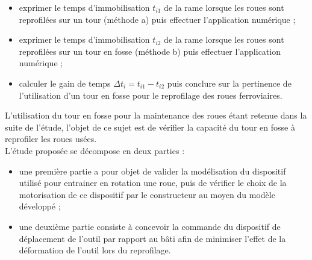 \begin{itemize}
  \item exprimer le temps d'immobilisation $t_{i 1}$ de la rame lorsque les roues sont reprofilées sur un tour (méthode a) puis effectuer l'application numérique ;
  \item exprimer le temps d'immobilisation $t_{i 2}$ de la rame lorsque les roues sont reprofilées sur un tour en fosse (méthode b) puis effectuer l'application numérique ;
  \item calculer le gain de temps $\Delta t_{i}=t_{i 1}-t_{i 2}$ puis conclure sur la pertinence de l'utilisation d'un tour en fosse pour le reprofilage des roues ferroviaires.
  \end{itemize}


L'utilisation du tour en fosse pour la maintenance des roues étant retenue dans la suite de l'étude, l'objet de ce sujet est de vérifier la capacité du tour en fosse à reprofiler les roues usées.\\
L'étude proposée se décompose en deux parties :
\begin{itemize}
  \item une première partie a pour objet de valider la modélisation du dispositif utilisé pour entrainer en rotation une roue, puis de vérifier le choix de la motorisation de ce dispositif par le constructeur au moyen du modèle développé ;
  \item une deuxième partie consiste à concevoir la commande du dispositif de déplacement de l'outil par rapport au bâti afin de minimiser l'effet de la déformation de l'outil lors du reprofilage.
\end{itemize}


